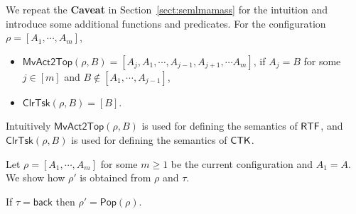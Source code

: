 \documentclass[preprint,12pt]{elsarticle}
\newcommand\Mm{{\mathcal{M} }}
\newcommand\act{{\sf Act}}
\newcommand\ctkflag{{\sf CTK}}
\newcommand\rtfflag{{\sf RTF}}
\newcommand{\IFAMASS}{\textsf{ASM}_\textsf{IF}}
\newcommand\back{{\mathsf{back} }}
\newcommand\topact{\mathsf{Top}}
\newcommand\btmact{\mathsf{Btm}}
\newcommand\push{\mathsf{Push}}
\newcommand\Pop{\mathsf{Pop}}
\newcommand\mvacttop{\mathsf{MvAct2Top}}
\newcommand\clrtop{\mathsf{ClrTop}}
\newcommand\clrtsk{\mathsf{ClrTsk}}
\begin{document}
We repeat the \textbf{Caveat} in Section~\ref{sect:semlmamass} for the intuition and introduce some additional functions and predicates. 
For the configuration $\rho = [A_1,\cdots,A_m]$, 
\begin{itemize}
	\item $\mvacttop(\rho, B) = [A_j,A_1,\cdots,A_{j-1},A_{j+1},\cdots A_m]$, if $A_j = B$ for some $j\in[m]$ and $B\notin[A_1,\cdots,A_{j-1}]$,
	\item $\clrtsk(\rho, B) = [B]$.
\end{itemize}

Intuitively $\mvacttop(\rho, B)$ is used for defining the semantics of $\rtfflag$, and $\clrtsk(\rho, B)$ is used for defining the semantics of $\ctkflag$.

Let $\rho = [A_1,\cdots,A_m]$ for some $m\ge 1$ be the current configuration and $A_1 = A$. We show how $\rho'$ is obtained from $\rho$ and $\tau$. 

If $\tau = \back$ then $\rho' = \Pop(\rho)$.
\end{document}
